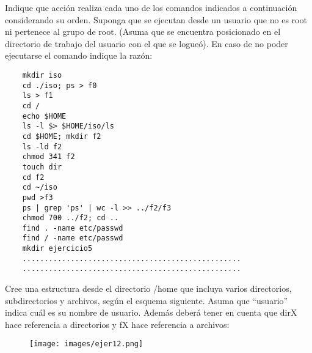 \begin{questions}
\question Indique que acción realiza cada uno de los comandos indicados a continuación considerando su orden. Suponga que se ejecutan desde un usuario que no es root ni pertenece al grupo de root. (Asuma que se encuentra posicionado en el directorio de trabajo del usuario con el que se logueó). En caso de no poder ejecutarse el comando indique la razón:
\begin{lstlisting}
	mkdir iso
	cd ./iso; ps > f0
	ls > f1
	cd /
	echo $HOME
	ls -l $> $HOME/iso/ls
	cd $HOME; mkdir f2
	ls -ld f2
	chmod 341 f2
	touch dir
	cd f2
	cd ~/iso
	pwd >f3
	ps | grep 'ps' | wc -l >> ../f2/f3
	chmod 700 ../f2; cd ..
	find . -name etc/passwd
	find / -name etc/passwd
	mkdir ejercicio5
	..................................................
	..................................................
\end{lstlisting}

\question Cree una estructura desde el directorio /home que incluya varios directorios, subdirectorios y archivos, según el esquema siguiente. Asuma que “usuario” indica cuál es su nombre de usuario. Además deberá tener en cuenta que dirX hace referencia a directorios y fX hace referencia a archivos:
\begin{figure}
	\centering
	\texttt{[image: images/ejer12.png]}
\end{figure}
\begin{parts}

\end{parts}
\end{questions}
